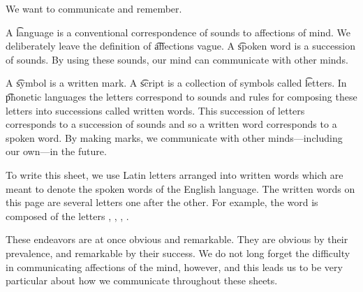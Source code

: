 
We want to communicate and remember.

A \t{language} is a conventional correspondence of sounds to affections of mind.
We deliberately leave the definition of \t{affections} vague.
A \t{spoken word} is a succession of sounds.
By using these sounds, our mind can communicate with other minds.

A \t{symbol} is a written mark.
A \t{script} is a collection of symbols called \t{letters}.
In \t{phonetic} languages the letters correspond to sounds and rules for composing these letters into successions called written words.
This succession of letters corresponds to a succession of sounds and so a written word corresponds to a spoken word.
By making marks, we communicate with other minds---including our own---in the future.

To write this sheet, we use Latin letters arranged into written words which are meant to denote the spoken words of the English language.
The written words on this page are several letters one after the other.
For example, the word  is composed of the letters , , , .

These endeavors are at once obvious and remarkable.
They are obvious by their prevalence, and remarkable by their success.
We do not long forget the difficulty in communicating affections of the mind, however, and this leads us to be very particular about how we communicate throughout these sheets.


